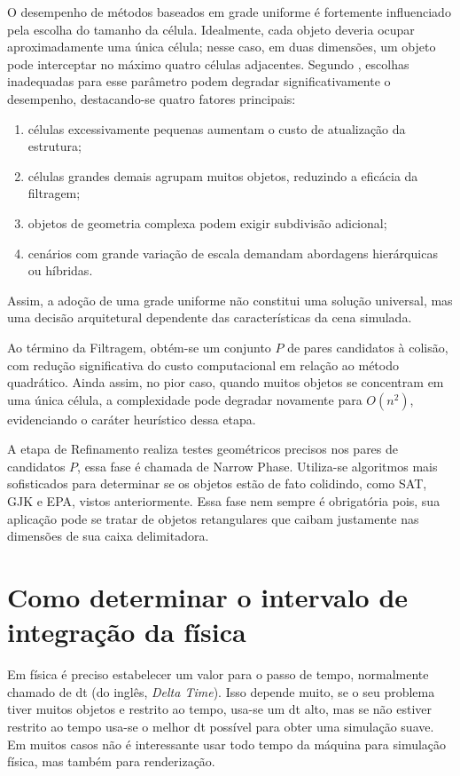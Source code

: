 O desempenho de métodos baseados em grade uniforme é fortemente influenciado pela escolha do tamanho da célula. Idealmente, cada objeto deveria ocupar aproximadamente uma única célula; nesse caso, em duas dimensões, um objeto pode interceptar no máximo quatro células adjacentes. Segundo , escolhas inadequadas para esse parâmetro podem degradar significativamente o desempenho, destacando-se quatro fatores principais:
\begin{enumerate}
	\item células excessivamente pequenas aumentam o custo de atualização da estrutura;
	\item células grandes demais agrupam muitos objetos, reduzindo a eficácia da filtragem;
	\item objetos de geometria complexa podem exigir subdivisão adicional;
	\item cenários com grande variação de escala demandam abordagens hierárquicas ou híbridas.
\end{enumerate}
Assim, a adoção de uma grade uniforme não constitui uma solução universal, mas uma decisão arquitetural dependente das características da cena simulada.

Ao término da Filtragem, obtém-se um conjunto $P$ de pares candidatos à colisão, com redução significativa do custo computacional em relação ao método quadrático. Ainda assim, no pior caso, quando muitos objetos se concentram em uma única célula, a complexidade pode degradar novamente para $O(n^2)$, evidenciando o caráter heurístico dessa etapa.

A etapa de Refinamento realiza testes geométricos precisos nos pares de candidatos $P$, essa fase é chamada de Narrow Phase. Utiliza-se algoritmos mais sofisticados para determinar se os objetos estão de fato colidindo, como SAT, GJK e EPA, vistos anteriormente. Essa fase nem sempre é obrigatória pois, sua aplicação pode se tratar de objetos retangulares que caibam justamente nas dimensões de sua caixa delimitadora.

\section{Como determinar o intervalo de integração da física}

Em física é preciso estabelecer um valor para o passo de tempo, normalmente chamado de dt (do inglês, \textit{Delta Time}). Isso depende muito, se o seu problema tiver muitos objetos e restrito ao tempo, usa-se um dt alto, mas se não estiver restrito ao tempo usa-se o melhor dt possível para obter uma simulação suave. Em muitos casos não é interessante usar todo tempo da máquina para simulação física, mas também para renderização.

